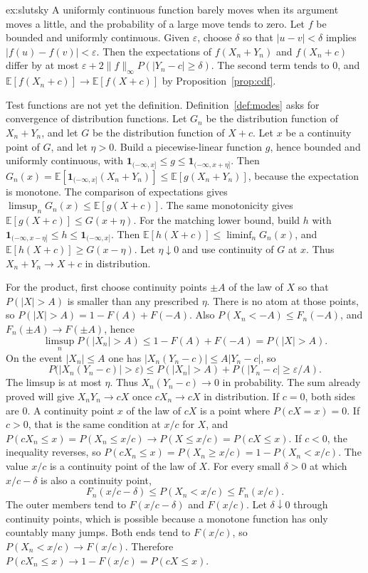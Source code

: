 \begin{solution}{ex:slutsky}
\idea A uniformly continuous function barely moves when its argument moves a little, and the probability of a large move tends to zero.
\writeup Let $f$ be bounded and uniformly continuous. Given $\varepsilon$, choose $\delta$ so that $|u-v|<\delta$ implies $|f(u)-f(v)|<\varepsilon$. Then the expectations of $f(X_n+Y_n)$ and $f(X_n+c)$ differ by at most $\varepsilon+2\|f\|_\infty P(|Y_n-c|\ge\delta)$. The second term tends to $0$, and $\mathbb E[f(X_n+c)]\to\mathbb E[f(X+c)]$ by Proposition~\ref{prop:cdf}.

Test functions are not yet the definition. Definition~\ref{def:modes} asks for convergence of distribution functions. Let $G_n$ be the distribution function of $X_n+Y_n$, and let $G$ be the distribution function of $X+c$. Let $x$ be a continuity point of $G$, and let $\eta>0$. Build a piecewise-linear function $g$, hence bounded and uniformly continuous, with $\mathbf 1_{(-\infty,x]}\le g\le\mathbf 1_{(-\infty,x+\eta]}$. Then $G_n(x)=\mathbb E[\mathbf 1_{(-\infty,x]}(X_n+Y_n)]\le\mathbb E[g(X_n+Y_n)]$, because the expectation is monotone. The comparison of expectations gives $\limsup_n G_n(x)\le\mathbb E[g(X+c)]$. The same monotonicity gives $\mathbb E[g(X+c)]\le G(x+\eta)$. For the matching lower bound, build $h$ with $\mathbf 1_{(-\infty,x-\eta]}\le h\le\mathbf 1_{(-\infty,x]}$. Then $\mathbb E[h(X+c)]\le\liminf_n G_n(x)$, and $\mathbb E[h(X+c)]\ge G(x-\eta)$. Let $\eta\downarrow0$ and use continuity of $G$ at $x$. Thus $X_n+Y_n\to X+c$ in distribution.

For the product, first choose continuity points $\pm A$ of the law of $X$ so that $P(|X|>A)$ is smaller than any prescribed $\eta$. There is no atom at those points, so $P(|X|>A)=1-F(A)+F(-A)$. Also $P(X_n<-A)\le F_n(-A)$, and $F_n(\pm A)\to F(\pm A)$, hence
\[
 \limsup_n P(|X_n|>A)\le 1-F(A)+F(-A)=P(|X|>A).
\]
On the event $|X_n|\le A$ one has $|X_n(Y_n-c)|\le A|Y_n-c|$, so
\[
 P\bigl(|X_n(Y_n-c)|>\varepsilon\bigr)\le P(|X_n|>A)+P(|Y_n-c|\ge\varepsilon/A).
\]
The limsup is at most $\eta$. Thus $X_n(Y_n-c)\to0$ in probability. The sum already proved will give $X_n Y_n\to cX$ once $cX_n\to cX$ in distribution. If $c=0$, both sides are $0$. A continuity point $x$ of the law of $cX$ is a point where $P(cX=x)=0$. If $c>0$, that is the same condition at $x/c$ for $X$, and $P(cX_n\le x)=P(X_n\le x/c)\to P(X\le x/c)=P(cX\le x)$. If $c<0$, the inequality reverses, so $P(cX_n\le x)=P(X_n\ge x/c)=1-P(X_n<x/c)$. The value $x/c$ is a continuity point of the law of $X$. For every small $\delta>0$ at which $x/c-\delta$ is also a continuity point,
\[
 F_n(x/c-\delta)\le P(X_n<x/c)\le F_n(x/c).
\]
The outer members tend to $F(x/c-\delta)$ and $F(x/c)$. Let $\delta\downarrow0$ through continuity points, which is possible because a monotone function has only countably many jumps. Both ends tend to $F(x/c)$, so $P(X_n<x/c)\to F(x/c)$. Therefore $P(cX_n\le x)\to1-F(x/c)=P(cX\le x)$.
\end{solution}

